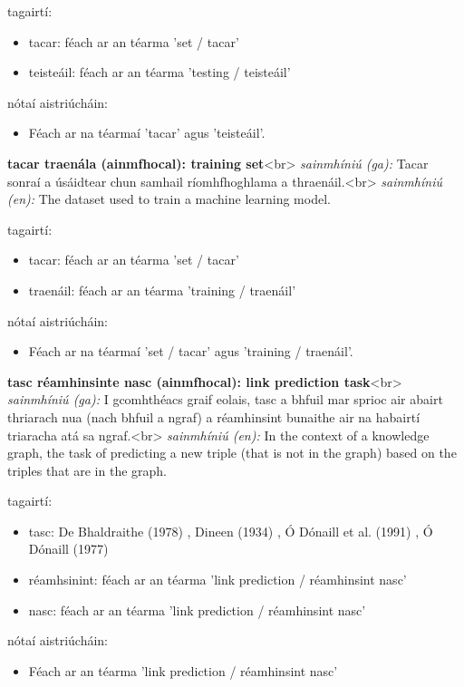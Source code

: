 \documentclass{article}
\begin{document}
tagairtí:
\begin{itemize}
	\item tacar: féach ar an téarma 'set / tacar'
	\item teisteáil: féach ar an téarma 'testing / teisteáil'
\end{itemize}

nótaí aistriúcháin:
\begin{itemize}
	\item Féach ar na téarmaí 'tacar' agus 'teisteáil'.
\end{itemize}


\textbf{tacar traenála (ainmfhocal): training set}<br>
\textit{sainmhíniú (ga):} Tacar sonraí a úsáidtear chun samhail ríomhfhoghlama a thraenáil.<br>
\textit{sainmhíniú (en):} The dataset used to train a machine learning model.

tagairtí:
\begin{itemize}
	\item tacar: féach ar an téarma 'set / tacar'
	\item traenáil: féach ar an téarma 'training / traenáil'
\end{itemize}

nótaí aistriúcháin:
\begin{itemize}
	\item Féach ar na téarmaí 'set / tacar' agus 'training / traenáil'.
\end{itemize}


\textbf{tasc réamhinsinte nasc (ainmfhocal): link prediction task}<br>
\textit{sainmhíniú (ga):} I gcomhthéacs graif eolais, tasc a bhfuil mar sprioc air abairt thriarach nua (nach bhfuil a ngraf) a réamhinsint bunaithe air na habairtí triaracha atá sa ngraf.<br>
\textit{sainmhíniú (en):} In the context of a knowledge graph, the task of predicting a new triple (that is not in the graph) based on the triples that are in the graph.

tagairtí:
\begin{itemize}
	\item tasc: De Bhaldraithe (1978) \cite{de-bhaldraithe}, Dineen (1934) \cite{dineen}, Ó Dónaill et al. (1991) \cite{focloir-beag}, Ó Dónaill (1977) \cite{odonaill}
	\item réamhsinint: féach ar an téarma 'link prediction / réamhinsint nasc'
	\item nasc: féach ar an téarma 'link prediction / réamhinsint nasc'
\end{itemize}

nótaí aistriúcháin:
\begin{itemize}
	\item Féach ar an téarma 'link prediction / réamhinsint nasc'
\end{itemize}
\end{document}
